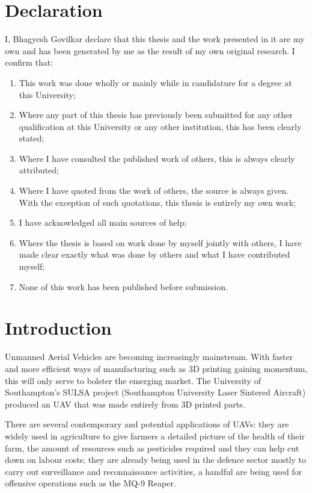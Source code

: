 \documentclass[
11pt, %
english, %
singlespacing, %
headsepline, %
] %
{MastersDoctoralThesis}
\begin{document}

\section*{Declaration}
\thispagestyle{fancy}
 I, Bhagyesh Govilkar declare that this thesis and the work presented in it are my own and has
been generated by me as the result of my own original research.
I confirm that:
\begin{enumerate}
\item  This work was done wholly or mainly while in candidature for a degree at this
University;
\item  Where any part of this thesis has previously been submitted for any other
qualification at this University or any other institution, this has been clearly stated;
\item  Where I have consulted the published work of others, this is always clearly
attributed;
\item  Where I have quoted from the work of others, the source is always given. With
the exception of such quotations, this thesis is entirely my own work;
\item  I have acknowledged all main sources of help;
\item  Where the thesis is based on work done by myself jointly with others, I have
made clear exactly what was done by others and what I have contributed myself;
\item  None of this work has been published before submission.
\end{enumerate}
 

\cleardoublepage


\section*{Introduction}
\thispagestyle{fancy}
Unmanned Aerial Vehicles are becoming increasingly mainstream. With faster and more efficient ways of manufacturing such as 3D printing gaining momentum, this will only serve to bolster the emerging market. The University of Southampton's SULSA project (Southampton University Laser Sintered Aircraft) produced an UAV that was made entirely from 3D printed parts. 

There are several contemporary and potential applications of UAVs: they are widely used in agriculture to give farmers a detailed picture of the health of their farm, the amount of resources such as pesticides required and they can help cut down on labour costs; they are already being used in the defence sector mostly to carry out surveillance and reconnaissance activities, a handful are being used for offensive operations such as the MQ-9 Reaper. 
\end{document}
